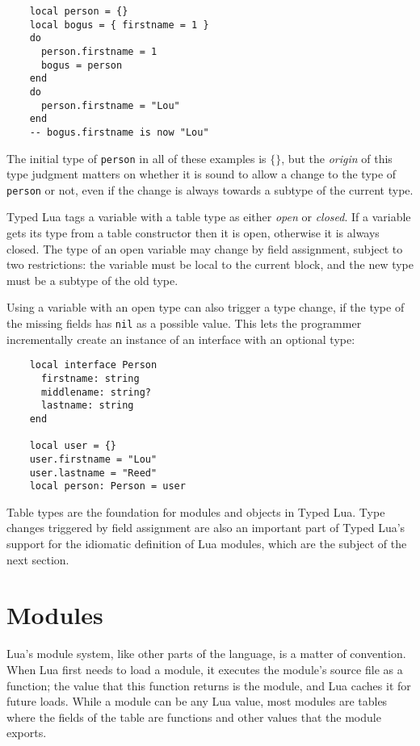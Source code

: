 \documentclass[preprint]{sig-alternate}
\begin{document}
\begin{verbatim}
    local person = {}
    local bogus = { firstname = 1 }
    do
      person.firstname = 1
      bogus = person
    end
    do
      person.firstname = "Lou"
    end
    -- bogus.firstname is now "Lou"
\end{verbatim}

The initial type of {\tt person} in all of these examples is
$\{\}$, but the {\em origin} of this type judgment matters
on whether it is sound to allow a change to the type of
{\tt person} or not, even if the change is always towards
a subtype of the current type.

Typed Lua tags a variable with a table type as either
{\em open} or {\em closed}. If a variable gets its type
from a table constructor then it is open, otherwise it is
always closed. The type of an open variable may change
by field assignment, subject to two restrictions: the
variable must be local to the current block, and the new type
must be a subtype of the old type.

Using a variable with an open type can also trigger a
type change, if the type of the missing fields has
{\tt nil} as a possible value. This lets the programmer
incrementally create an instance of an interface with
an optional type:

\begin{verbatim}
    local interface Person
      firstname: string
      middlename: string?
      lastname: string
    end

    local user = {}
    user.firstname = "Lou"
    user.lastname = "Reed"
    local person: Person = user
\end{verbatim}

Table types are the foundation for modules and objects in
Typed Lua. Type changes triggered by field assignment are
also an important part of Typed Lua's support for the
idiomatic definition of Lua modules, which are the
subject of the next section.

\section{Modules}
\label{sec:modules}

Lua's module system, like other parts of the language, is
a matter of convention. When Lua first needs to load a
module, it executes the module's source file as a function;
the value that this function returns is the module, and Lua
caches it for future loads. While a module can be any
Lua value, most modules are tables where the fields
of the table are functions and other values that the
module exports.
\end{document}
